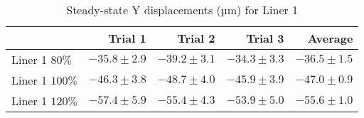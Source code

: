 \begin{table}[htbp!]
\centering
\begin{tabular}{lrrrr}
\toprule
  & Trial 1 & Trial 2 & Trial 3 & Average \\
\midrule
 Liner 1 $80\%$ & $-35.8 \pm 2.9$ & $-39.2 \pm 3.1$ & $-34.3 \pm 3.3$ & $-36.5 \pm 1.5$ \\
 Liner 1 $100\%$ & $-46.3 \pm 3.8$ & $-48.7 \pm 4.0$ & $-45.9 \pm 3.9$ & $-47.0 \pm 0.9$ \\
 Liner 1 $120\%$ & $-57.4 \pm 5.9$ & $-55.4 \pm 4.3$ & $-53.9 \pm 5.0$ & $-55.6 \pm 1.0$ \\
\bottomrule
\end{tabular}
\caption{Steady-state Y displacements (µm) for Liner 1}
\label{fig:liner_1_results_table}
\end{table}